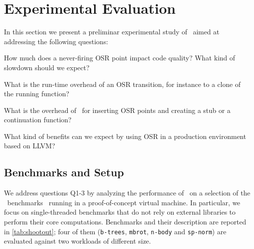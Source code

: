 
\section{Experimental Evaluation}
\label{se:experiments}

In this section we present a preliminar experimental study of \osrkit\ aimed at addressing the following questions:
\ifdefined \noauthorea
\begin{description}
\else
\begin{description}
\fi
\item[Q1] How much does a never-firing OSR point impact code quality? What kind of slowdown should we expect?
\item[Q2] What is the run-time overhead of an OSR transition, for instance to a clone of the running function?
\item[Q3] What is the overhead of \osrkit\ for inserting OSR points and creating a stub or a continuation function?
\item[Q4] What kind of benefits can we expect by using OSR in a production environment based on LLVM?
\end{description}

\subsection{Benchmarks and Setup}
We address questions Q1-3 by analyzing the performance of \osrkit\ on a selection of the \shootout\ benchmarks~\cite{shootout} running in a proof-of-concept virtual machine. In particular, we focus on single-threaded benchmarks that do not rely on external libraries to perform their core computations. Benchmarks and their description are reported in \mytable\ref{tab:shootout}; four of them ({\tt b-trees}, {\tt mbrot}, {\tt n-body} and {\tt sp-norm}) are evaluated against two workloads of different size.



\end{description}
